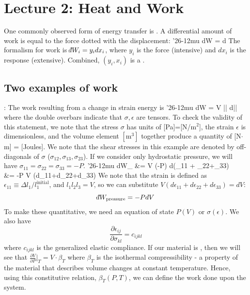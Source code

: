 \documentclass[12pt]{article}
\def\dbar{{\mathchar'26\mkern-12mu d}}
\begin{document}

\section{Lecture 2: Heat and Work}
One commonly observed form of energy transfer is . A differential amount of work is equal to the force dotted with the displacement:
\eqs
\dbar W =  \cdot d
\eqe
The formalism for work is $\dbar W_i = y_i dx_i$, where $y_i$ is the force (intensive) and $dx_i$ is the response (extensive). Combined, $(y_i, x_i)$ is a .
\subsection{Two examples of work}
: The work resulting from a change in strain energy is 
\eqs
\dbar W = V \bar{\bar{\sigma}} \cdot d\bar{\bar{\epsilon}}
\eqe 
where the double overbars indicate that $\sigma, \epsilon$ are tensors.  To check the validity of this statement, we note that the stress $\sigma$ has units of [Pa]=[N/$\text{m}^2$], the strain $\epsilon$ is dimensionless, and the volume element $[\text{m}^3]$ together produce a quantity of [N$\cdot$ m] = [Joules]. We note that the shear stresses in this example are denoted by off-diagonals of $\sigma$ ($\sigma_{12}, \sigma_{13}, \sigma_{23}$).  If we consider only hydrostatic pressure, we will have $\sigma_{11}=\sigma_{22}=\sigma_{33}=-P$.
\eqs
\dbar W_ &= V \cdot (-P) d(\epsilon_{11} + \epsilon_{22}+\epsilon_{33})\\
&= -P V (d\epsilon_{11}+d\epsilon_{22}+d\epsilon_{33})
\eqe
We note that the strain is defined as $\epsilon_{11} \equiv \Delta l_1 / l_1^{\text{initial}}$, and $l_1 l_2 l_3 = V$, so we can substitute $V (d\epsilon_{11}+d\epsilon_{22}+d\epsilon_{33}) = dV$:
\begin{equation}
\dbar W_\text{pressure} = -P dV
\end{equation}
To make these quantitative, we need an equation of state $P(V)$ or $\sigma(\epsilon)$.  We also have
\begin{equation}
\frac{\partial \epsilon_{ij}}{\partial \sigma_{kl}} = c_{ijkl}
\end{equation}
where $c_{ijkl}$ is the generalized elastic compliance.  If our material is , then we will see that $\frac{\partial V}{\partial P}|_T = V \cdot \beta_T$ where $\beta_T$ is the isothermal compressibility - a property of the material that describes volume changes at constant temperature. Hence, using this constitutive relation, $\beta_T(P,T)$, we can define the work done upon the system. \\
\end{document}
